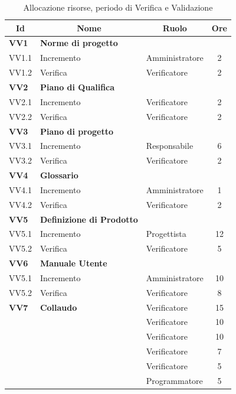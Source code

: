\begin{table}[H]
	\centering
	\begin{tabular*}{1\textwidth}{ @{\extracolsep{\fill} } l l l c  }
	\hline
	\multicolumn{1}{c}{\textbf{Id}} & 
	\multicolumn{1}{c}{\textbf{Nome}} & 
	\multicolumn{1}{c}{\textbf{Ruolo}}& 
	\multicolumn{1}{c}{\textbf{Ore}} \\
	\hline
	
	\textbf{VV1} & \textbf{Norme di progetto} \\
	\cline{3-4}
	VV1.1 & Incremento & Amministratore & 2\\ 
    \cline{3-4}
	VV1.2 & Verifica & Verificatore & 2\\
	
	\hline
	\textbf{VV2} & \textbf{Piano di Qualifica} \\
	\cline{3-4}
	VV2.1 & Incremento & Verificatore & 2\\
        \cline{3-4}
	VV2.2 & Verifica & Verificatore & 2\\
	
	\hline
	\textbf{VV3} & \textbf{Piano di progetto} \\
	\cline{3-4}
	VV3.1 & Incremento & Responsabile & 6\\
        \cline{3-4}
	VV3.2 & Verifica & Verificatore & 2\\

	\hline
	\textbf{VV4} & \textbf{Glossario} \\
	\cline{3-4}
	VV4.1 & Incremento & Amministratore & 1\\
    \cline{3-4}
	VV4.2 & Verifica & Verificatore & 2\\

        \hline
        \textbf{VV5} & \textbf{Definizione di Prodotto} \\
	\cline{3-4}
        VV5.1 & Incremento & Progettista & 12\\
        \cline{3-4}
	VV5.2 & Verifica & Verificatore & 5\\

        \hline
        \textbf{VV6} & \textbf{Manuale Utente} \\
	\cline{3-4}
        VV5.1 & Incremento & Amministratore & 10\\
        \cline{3-4}
	VV5.2 & Verifica & Verificatore & 8\\
                
        \hline
        \textbf{VV7} & \textbf{Collaudo} & Verificatore & 15\\
        & & Verificatore & 10\\
        & & Verificatore & 10\\
        & & Verificatore & 7\\
        & & Verificatore & 5\\
        & & Programmatore & 5\\

        \hline
	\end{tabular*}
        \caption{Allocazione risorse, periodo di Verifica e Validazione}
	\end{table}



\newpage